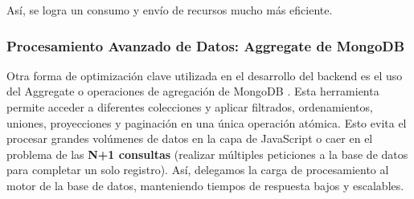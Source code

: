 Así, se logra un consumo y envío de recursos mucho más eficiente.

\subsubsection{Procesamiento Avanzado de Datos: Aggregate de MongoDB}

Otra forma de optimización clave utilizada en el desarrollo del backend es el uso del Aggregate o operaciones de agregación de MongoDB \cite{mongodb_aggregation_2026}. Esta herramienta permite acceder a diferentes colecciones y aplicar filtrados, ordenamientos, uniones, proyecciones y paginación en una única operación atómica. Esto evita el procesar grandes volúmenes de datos en la capa de JavaScript o caer en el problema de las \textbf{N+1 consultas} (realizar múltiples peticiones a la base de datos para completar un solo registro). Así, delegamos la carga de procesamiento al motor de la base de datos, manteniendo tiempos de respuesta bajos y escalables.

